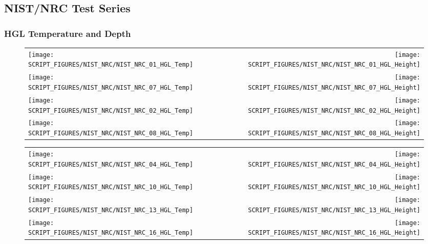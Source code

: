 \clearpage

\subsection{NIST/NRC Test Series}

\subsubsection{HGL Temperature and Depth}

\begin{figure}[!ht]
\begin{tabular*}{\textwidth}{l@{\extracolsep{\fill}}r}
\texttt{[image: SCRIPT\_FIGURES/NIST\_NRC/NIST\_NRC\_01\_HGL\_Temp]} &
\texttt{[image: SCRIPT\_FIGURES/NIST\_NRC/NIST\_NRC\_01\_HGL\_Height]} \\
\texttt{[image: SCRIPT\_FIGURES/NIST\_NRC/NIST\_NRC\_07\_HGL\_Temp]} &
\texttt{[image: SCRIPT\_FIGURES/NIST\_NRC/NIST\_NRC\_07\_HGL\_Height]} \\
\texttt{[image: SCRIPT\_FIGURES/NIST\_NRC/NIST\_NRC\_02\_HGL\_Temp]} &
\texttt{[image: SCRIPT\_FIGURES/NIST\_NRC/NIST\_NRC\_02\_HGL\_Height]} \\
\texttt{[image: SCRIPT\_FIGURES/NIST\_NRC/NIST\_NRC\_08\_HGL\_Temp]} &
\texttt{[image: SCRIPT\_FIGURES/NIST\_NRC/NIST\_NRC\_08\_HGL\_Height]}
\end{tabular*}
\end{figure}

\begin{figure}[!ht]
\begin{tabular*}{\textwidth}{l@{\extracolsep{\fill}}r}
\texttt{[image: SCRIPT\_FIGURES/NIST\_NRC/NIST\_NRC\_04\_HGL\_Temp]} &
\texttt{[image: SCRIPT\_FIGURES/NIST\_NRC/NIST\_NRC\_04\_HGL\_Height]} \\
\texttt{[image: SCRIPT\_FIGURES/NIST\_NRC/NIST\_NRC\_10\_HGL\_Temp]} &
\texttt{[image: SCRIPT\_FIGURES/NIST\_NRC/NIST\_NRC\_10\_HGL\_Height]} \\
\texttt{[image: SCRIPT\_FIGURES/NIST\_NRC/NIST\_NRC\_13\_HGL\_Temp]} &
\texttt{[image: SCRIPT\_FIGURES/NIST\_NRC/NIST\_NRC\_13\_HGL\_Height]} \\
\texttt{[image: SCRIPT\_FIGURES/NIST\_NRC/NIST\_NRC\_16\_HGL\_Temp]} &
\texttt{[image: SCRIPT\_FIGURES/NIST\_NRC/NIST\_NRC\_16\_HGL\_Height]}
\end{tabular*}
\end{figure}

